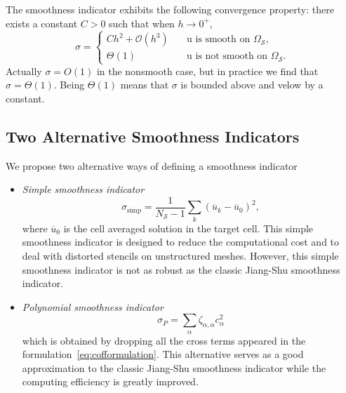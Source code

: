 The smoothness indicator exhibits the following convergence property:
there exists a constant $C > 0$ such that when $h \rightarrow 0^+$,
\begin{equation}\label{eq:smoothconvergence}
		  \sigma = \begin{cases}
					 Ch^2 + \mathcal{O} (h^3) \quad &\text{u is smooth on $\Omega_{\mathcal{S}}$}, \\
					 \Theta (1)  &\text{u is not smooth on $\Omega_{\mathcal{S}}$}.
		  \end{cases}
\end{equation}
Actually $\sigma = O(1)$ in the nonsmooth case, but in practice we find that
$\sigma = \Theta(1)$. Being $\Theta(1)$ means that $\sigma$ is bounded above
and velow by a constant.

\subsection{Two Alternative Smoothness Indicators}
We propose two alternative ways of defining a smoothness indicator

\begin{itemize}
\item \textit{Simple smoothness indicator}~\cite{WENOAOSimplifiedSmoothness}
\begin{equation}\label{eq:simpsmoothnessIC}
\sigma_{\text{simp}} = \frac{1}{N_\mathcal{S} -1 } \sum_k (\overline{u}_k - \overline{u}_0)^2,
\end{equation}
where $\overline{u}_0$ is the cell averaged solution in the target cell.
This simple smoothness indicator is designed to reduce the computational cost and to deal with
distorted stencils on unstructured meshes. However, this simple smoothness indicator is not as robust
as the classic Jiang-Shu smoothness indicator.

\item \textit{Polynomial smoothness indicator}~\cite{sigmaP}
		  \begin{equation}\label{eq:polysigma}
					 \sigma_{P} = \sum_{\alpha} \zeta_{\alpha, \alpha} c_{\alpha}^2
		  \end{equation}
		  which is obtained by dropping all the cross terms appeared in the formulation~\eqref{eq:cofformulation}.
		  This alternative serves as a good approximation to the classic Jiang-Shu smoothness indicator while the 
		  computing efficiency is greatly improved.
\end{itemize}

